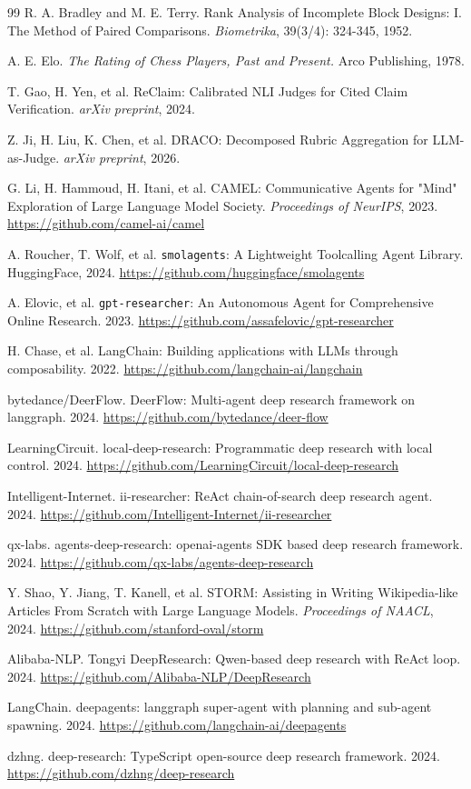 \documentclass[UTF8,a4paper,12pt,oneside]{ctexart}
\begin{document}
\begin{thebibliography}{99}
 R. A. Bradley and M. E. Terry. Rank Analysis of Incomplete Block Designs: I. The Method of Paired Comparisons. \emph{Biometrika}, 39(3/4): 324-345, 1952.

 A. E. Elo. \emph{The Rating of Chess Players, Past and Present.} Arco Publishing, 1978.

 T. Gao, H. Yen, et al. ReClaim: Calibrated NLI Judges for Cited Claim Verification. \emph{arXiv preprint}, 2024.

 Z. Ji, H. Liu, K. Chen, et al. DRACO: Decomposed Rubric Aggregation for LLM-as-Judge. \emph{arXiv preprint}, 2026.

 G. Li, H. Hammoud, H. Itani, et al. CAMEL: Communicative Agents for "Mind" Exploration of Large Language Model Society. \emph{Proceedings of NeurIPS}, 2023. \url{https://github.com/camel-ai/camel}

 A. Roucher, T. Wolf, et al. \texttt{smolagents}: A Lightweight Toolcalling Agent Library. HuggingFace, 2024. \url{https://github.com/huggingface/smolagents}

 A. Elovic, et al. \texttt{gpt-researcher}: An Autonomous Agent for Comprehensive Online Research. 2023. \url{https://github.com/assafelovic/gpt-researcher}

 H. Chase, et al. LangChain: Building applications with LLMs through composability. 2022. \url{https://github.com/langchain-ai/langchain}

 bytedance/DeerFlow. DeerFlow: Multi-agent deep research framework on langgraph. 2024. \url{https://github.com/bytedance/deer-flow}

 LearningCircuit. local-deep-research: Programmatic deep research with local control. 2024. \url{https://github.com/LearningCircuit/local-deep-research}

 Intelligent-Internet. ii-researcher: ReAct chain-of-search deep research agent. 2024. \url{https://github.com/Intelligent-Internet/ii-researcher}

 qx-labs. agents-deep-research: openai-agents SDK based deep research framework. 2024. \url{https://github.com/qx-labs/agents-deep-research}

 Y. Shao, Y. Jiang, T. Kanell, et al. STORM: Assisting in Writing Wikipedia-like Articles From Scratch with Large Language Models. \emph{Proceedings of NAACL}, 2024. \url{https://github.com/stanford-oval/storm}

 Alibaba-NLP. Tongyi DeepResearch: Qwen-based deep research with ReAct loop. 2024. \url{https://github.com/Alibaba-NLP/DeepResearch}

 LangChain. deepagents: langgraph super-agent with planning and sub-agent spawning. 2024. \url{https://github.com/langchain-ai/deepagents}

 dzhng. deep-research: TypeScript open-source deep research framework. 2024. \url{https://github.com/dzhng/deep-research}

\end{thebibliography}
\end{document}
